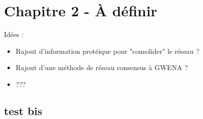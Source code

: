 \setcounter{chapter}{3}
\chapter*{Chapitre 2 - À définir}

Idées :
\begin{itemize}
    \item Rajout d'information protéique pour "consolider" le réseau ?
    \item Rajout d'une méthode de réseau consensus à GWENA ?
    \item ???
\end{itemize}

\section{test bis}

